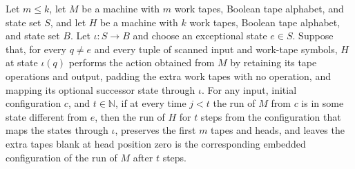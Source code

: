 \begin{theorem}
\label{Turing.embed_run}
\leanok
{}
Let $m\le k$, let $M$ be a machine with $m$ work tapes, Boolean tape alphabet, and state
set $S$, and let $H$ be a machine with $k$ work tapes, Boolean tape alphabet, and state
set $B$. Let $\iota:S\to B$ and choose an exceptional state $e\in S$. Suppose that, for
every $q\ne e$ and every tuple of scanned input and work-tape symbols, $H$ at state
$\iota(q)$ performs the action obtained from $M$ by retaining its tape operations and
output, padding the extra work tapes with no operation, and mapping its optional
successor state through $\iota$. For any input, initial configuration $c$, and
$t\in\mathbb N$, if at every time $j<t$ the run of $M$ from $c$ is in some state
different from $e$, then the run of $H$ for $t$ steps from the configuration that maps
the states through $\iota$, preserves the first $m$ tapes and heads, and leaves the
extra tapes blank at head position zero is the corresponding embedded configuration of
the run of $M$ after $t$ steps.
\end{theorem}
